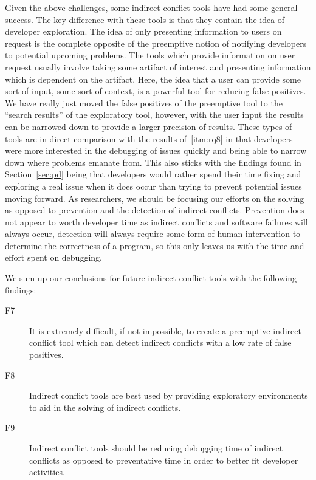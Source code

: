 \documentclass[conference]{IEEEtran}
\makeatletter
\def\namedlabel#1#2{\begingroup
   \def\@currentlabel{#2}%
   \label{#1}\endgroup
}
\makeatother
\begin{document}
Given the above challenges, some indirect conflict tools have had some general success. The key difference with these tools is that they
contain the idea of developer exploration. The idea of only presenting information to users on request is the complete opposite of the preemptive
notion of notifying developers to potential upcoming problems. The tools which provide information on user request usually involve taking some
artifact of interest and presenting information which is dependent on the artifact. Here, the idea that a user can provide some sort of
input, some sort of context, is a powerful tool for reducing false positives. We have really just moved the false positives of the preemptive
tool to the ``search results'' of the exploratory tool, however, with the user input the results can be narrowed down to provide a larger
precision of results. These types of tools are in direct comparison with the results of~\ref{itm:rq8} in that developers were more interested in
the debugging of issues quickly and being able to narrow down where problems emanate from. This also sticks with the findings found in
Section~\ref{sec:pd} being that developers would rather spend their time fixing and exploring a real issue when it does occur than trying
to prevent potential issues moving forward. As researchers, we should be focusing our efforts on the solving as opposed to prevention and 
the detection of indirect conflicts. Prevention does not appear to worth developer time as indirect conflicts and software failures will always
occur, detection will always require some form of human intervention to determine the correctness of a program, so this only leaves us with
the time and effort spent on debugging. 

We sum up our conclusions for future indirect conflict tools with the following findings:
\begin{description}
	\item[F7\namedlabel{itm:f7}{F7}] It is extremely difficult, if not impossible, to create a preemptive indirect 
																	 conflict tool which can detect indirect conflicts with a low rate of false positives.
	\item[F8\namedlabel{itm:f8}{F8}] Indirect conflict tools are best used by providing exploratory environments to aid in the solving of indirect conflicts.
	\item[F9\namedlabel{itm:f9}{F9}] Indirect conflict tools should be reducing debugging time of indirect conflicts as opposed to preventative
																	 time in order to better fit developer activities.
\end{description}
\end{document}

